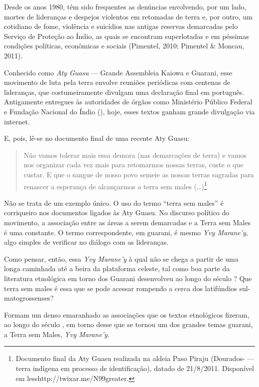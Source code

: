 Desde os anos 1980, têm sido frequentes as denúncias envolvendo, por um
lado, mortes de lideranças e despejos violentos em retomadas de terra
e, por outro, um cotidiano de fome, violência e suicídios nas antigas
reservas demarcadas pelo Serviço de Proteção ao Índio, as quais se
encontram superlotadas e em péssimas condições políticas, econômicas e
sociais (Pimentel, 2010; Pimentel \& Moncau, 2011).

Conhecido como \emph{Aty Guasu} --- Grande Assembleia Kaiowa e Guarani, esse
movimento de luta pela terra envolve reuniões periódicas com centenas
de lideranças, que costumeiramente divulgam uma declaração final em
português. Antigamente entregues às autoridades de órgãos como
Ministério Público Federal e Fundação Nacional do Índio (), hoje,
esses textos ganham grande divulgação via internet.

E, pois, lê-se no documento final de uma recente Aty Guasu:

\begin{quotation}
Não vamos tolerar mais essa demora (nas demarcações de terra) e vamos
nos organizar cada vez mais para retomarmos nossas terras, custe o que
custar. E que o sangue de nosso povo semeie as nossas terras sagradas
para renascer a esperança de alcançarmos a terra sem males
(\ldots{})\footnote{Documento final da Aty Guasu realizada na aldeia Paso
Piraju (Dourados- --- terra indígena em processo de identificação),
datado de 21/8/2011. Disponível em
{less}http://twixar.me/N99{greater}.}
\end{quotation}

Não se trata de um exemplo único. O uso do termo ``terra sem males'' é
corriqueiro nos documentos ligados às Aty Guasu. No discurso político
do movimento, a associação entre as áreas a serem demarcadas e a Terra
sem Males é uma constante. O termo correspondente, em guarani, é mesmo
\emph{Yvy Marane’y}, algo simples de verificar no diálogo com as lideranças.

Como pensar, então, essa \emph{Yvy Marane’y} à qual não se chega a partir de
uma longa caminhada até a beira da plataforma celeste, tal como boa
parte da literatura etnológica em torno dos Guarani desenvolveu ao
longo do século ? Que terra sem males é essa que se pode acessar
rompendo a cerca dos latifúndios sul-matogrossenses?

Formam um denso emaranhado as associações que os textos etnológicos
fizeram, ao longo do século , em torno desse que se tornou um dos
grandes temas guarani, a Terra sem Males, \emph{Yvy Marane’y}.


